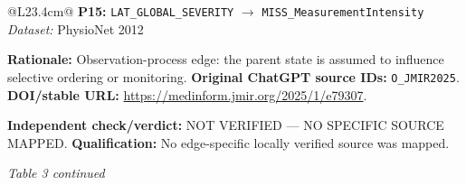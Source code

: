 \begin{tabular}{@{}L{23.4cm}@{}}
\addlinespace[2pt]
\midrule
\textbf{P15:} \nolinkurl{LAT_GLOBAL_SEVERITY} $\rightarrow$ \nolinkurl{MISS_MeasurementIntensity} \hfill \textit{Dataset:} PhysioNet 2012\par\textbf{Rationale:} Observation-process edge: the parent state is assumed to influence selective ordering or monitoring. \textbf{Original ChatGPT source IDs:} \nolinkurl{O_JMIR2025}. \textbf{DOI/stable URL:} \url{https://medinform.jmir.org/2025/1/e79307}.\par\textbf{Independent check/verdict:} NOT VERIFIED --- NO SPECIFIC SOURCE MAPPED. \textbf{Qualification:} No edge-specific locally verified source was mapped. \\
\addlinespace[2pt]
\midrule
\bottomrule
\end{tabular}
\clearpage
\textit{Table 3 continued}\par
